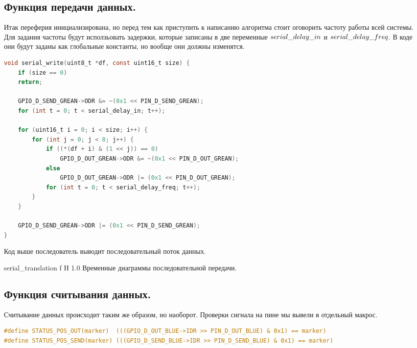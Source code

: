 \documentclass{bmstu}
\begin{document}
	\subsection{Функция передачи данных.}
	
	Итак переферия инициализирована, но перед тем как приступить к написанию алгоритма стоит оговорить частоту работы всей системы.
	Для задания частоты будут исползьовать задержки, которые записаны в две переменные $serial\text{\textunderscore}delay\text{\textunderscore}in$ и $serial\text{\textunderscore}delay\text{\textunderscore}freq$. 
	В коде они будут заданы как глобальные константы, но вообще они должны изменятся.
	
	\begingroup
	\fontsize{12pt}{12pt}\selectfont
	\begin{lstlisting}[language=C, name=serial_transmission_c]
void serial_write(uint8_t *df, const uint16_t size) {
	if (size == 0)
	return;
	
	GPIO_D_SEND_GREAN->ODR &= ~(0x1 << PIN_D_SEND_GREAN);
	for (int t = 0; t < serial_delay_in; t++);
	
	for (uint16_t i = 0; i < size; i++) {
		for (int j = 0; j < 8; j++) {
			if ((*(df + i) & (1 << j)) == 0)
				GPIO_D_OUT_GREAN->ODR &= ~(0x1 << PIN_D_OUT_GREAN);
			else
				GPIO_D_OUT_GREAN->ODR |= (0x1 << PIN_D_OUT_GREAN);
			for (int t = 0; t < serial_delay_freq; t++);
		}
	}
	
	GPIO_D_SEND_GREAN->ODR |= (0x1 << PIN_D_SEND_GREAN);
}
	\end{lstlisting}
	\endgroup
	
	Код выше последователь выводит последовательный поток данных.
	
	{serial_translation} %
	{f} %
	{H} %
	{1.0\textwidth} %
	{Временные диаграммы последовательной передачи.}
	
	\subsection{Функция считывания данных.}
	
	Считывание данных происходит таким же образом, но наоборот. Проверки сигнала на пине мы вывели в отдельный макрос.
	
	\begingroup
	\fontsize{8pt}{12pt}\selectfont
	\begin{lstlisting}[language=C, name=serial_transmission_c]
#define STATUS_POS_OUT(marker)  (((GPIO_D_OUT_BLUE->IDR >> PIN_D_OUT_BLUE) & 0x1) == marker)
#define STATUS_POS_SEND(marker) (((GPIO_D_SEND_BLUE->IDR >> PIN_D_SEND_BLUE) & 0x1) == marker)
	\end{lstlisting}
	\endgroup
	
\end{document}
